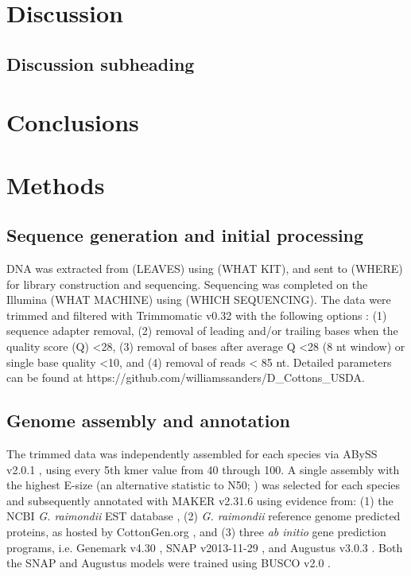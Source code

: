 \documentclass{bmcart}
\newcommand{\note}[2][]{\added[id=#1,remark={#2}]{}}
\begin{document}
\section*{Discussion}
\subsection*{Discussion subheading}

\section*{Conclusions}

\section*{Methods}
\subsection*{Sequence generation and initial processing}
DNA was extracted from (LEAVES) using (WHAT KIT), and sent to (WHERE) for library construction and sequencing.  Sequencing was completed on the Illumina (WHAT MACHINE) using (WHICH SEQUENCING). The data were trimmed and filtered with Trimmomatic v0.32 \note[Corrinne]{citation} with the following options : (1) sequence adapter removal, (2) removal of leading and/or trailing bases when the quality score (Q) <28, (3) removal of bases after average Q <28 (8 nt window) or single base quality <10, and (4) removal of reads < 85 nt. Detailed parameters can be found at https://github.com/williamssanders/D\_Cottons\_USDA. \note[Corrinne]{Let's port this repo to a lab site after and give the new url}

\subsection*{Genome assembly and annotation}
The trimmed data was independently assembled for each species via ABySS v2.0.1 \note[Corrinne]{citation}, using every 5th kmer value from 40 through 100. A single assembly with the highest E-size  (an alternative statistic to N50; \note[Corrinne]{citation Salzberg 2011}) was selected for each species and subsequently annotated with MAKER v2.31.6 \note[Corrinne]{citation} using evidence from: (1) the NCBI \textit{G. raimondii} EST database \note[Corrinne]{citation}, (2) \textit{G. raimondii} reference genome predicted proteins, as hosted by CottonGen.org \note[Corrinne]{citation}, and (3) three \textit{ab initio} gene prediction programs, i.e. Genemark v4.30 \note[Corrinne]{citation}, SNAP v2013-11-29 \note[Corrinne]{citation}, and Augustus v3.0.3 \note[Corrinne]{citation}. Both the SNAP and Augustus models were trained using BUSCO v2.0 \note[Corrinne]{citation}.    
\end{document}
